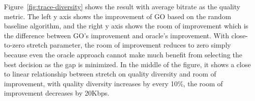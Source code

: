 Figure~\ref{fig:trace-diversity} shows the result with average bitrate as the quality metric. The left y axis shows the improvement of GO based on the random baseline algorithm, and the right y axis shows the room of improvement which is the difference between GO's improvement and oracle's improvement. With close-to-zero stretch parameter, the room of improvement reduces to zero simply because even the oracle approach cannot make much benefit from selecting the best decision as the gap is minimized. 
In the middle of the figure, it shows a close to linear relationship between stretch on quality diversity and room of improvement, with quality diversity increases by every 10\%, the room of improvement decreases by 20Kbps. 



\begin{packedenumerate}
	\item 
	\item 
\end{packedenumerate}






































